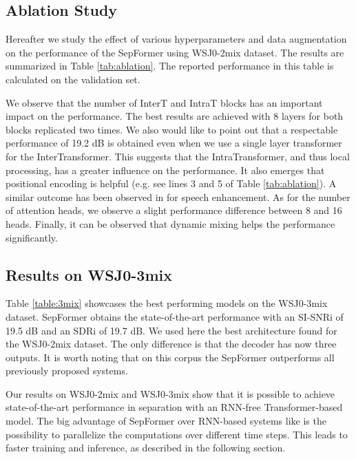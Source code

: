 \documentclass{article}
\begin{document}
\subsection{Ablation Study} 

Hereafter we study the effect of various hyperparameters and data augmentation on the performance of the SepFormer using WSJ0-2mix dataset. The results are summarized in Table \ref{tab:ablation}. The reported performance in this table is calculated on the validation set.

We observe that the number of InterT and IntraT blocks has an important impact on the performance. The best results are achieved with 8 layers for both blocks replicated two times. We also would like to point out that a respectable performance of 19.2 dB is obtained even when we use a single layer transformer for the InterTransformer. This suggests that the IntraTransformer, and thus local processing, has a greater influence on the performance. It also emerges that positional encoding is helpful (e.g. see lines 3 and 5 of Table \ref{tab:ablation}). A similar outcome has been observed in \cite{kim2020t} for speech enhancement. As for the number of attention heads, we observe a slight performance difference between 8 and 16 heads. Finally, it can be observed that dynamic mixing helps the performance significantly. 

\vspace{-0.25cm}
\subsection{Results on WSJ0-3mix}
\vspace{-0.1cm}
Table \ref{table:3mix} showcases the best performing models on the WSJ0-3mix dataset. SepFormer obtains the state-of-the-art performance with an SI-SNRi of 19.5 dB and an SDRi of 19.7 dB.
We used here the best architecture found for the WSJ0-2mix dataset. The only difference is that the decoder has now three outputs. 
It is worth noting that on this corpus the SepFormer outperforms all previously proposed systems. 



Our results on WSJ0-2mix and WSJ0-3mix show that it is possible to achieve state-of-the-art performance in separation with an RNN-free Transformer-based model. The big advantage of SepFormer over RNN-based systems like \cite{luo2020dualpath, nachmani2020voice, dptn} is the possibility to parallelize the computations over different time steps. This leads to faster training and inference, as described in the following section.
\end{document}
